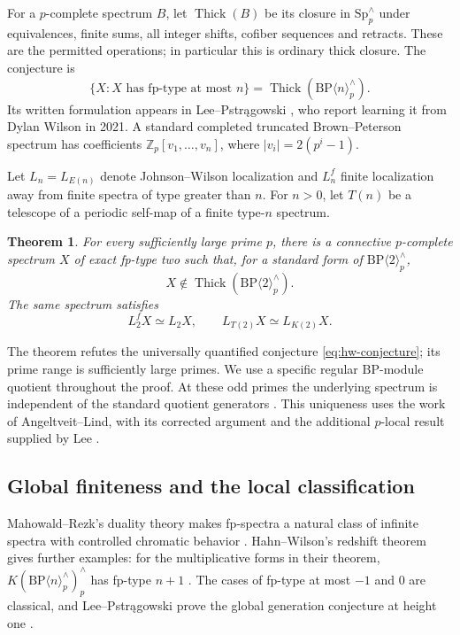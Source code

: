 \documentclass[11pt]{article}
\DeclareMathOperator{\Thick}{Thick}
\newcommand{\Sp}{\mathrm{Sp}}
\newcommand{\BP}{\mathrm{BP}}
\newcommand{\Z}{\mathbb Z}
\newtheorem{theorem}{Theorem}[section]
\theoremstyle{definition}
\theoremstyle{remark}
\numberwithin{equation}{section}
\begin{document}
For a $p$-complete spectrum $B$, let $\Thick(B)$ be its closure in
$\Sp_p^\wedge$ under equivalences, finite sums, all integer shifts,
cofiber sequences and retracts. These are the permitted operations;
in particular this is ordinary thick closure. The conjecture is
\begin{equation}\label{eq:hw-conjecture}
 \{X:\text{$X$ has fp-type at most $n$}\}
 =\Thick(\BP\langle n\rangle_p^\wedge).
\end{equation}
Its written formulation appears in Lee--Pstr\k{a}gowski
\cite[Conjecture~1.1 and Note~1]{LP2026}, who report learning it from Dylan Wilson
in 2021. A standard completed truncated Brown--Peterson spectrum has
coefficients $\Z_p[v_1,\ldots,v_n]$, where $|v_i|=2(p^i-1)$.

Let $L_n=L_{E(n)}$ denote Johnson--Wilson localization and $L_n^f$
finite localization away from finite spectra of type greater than $n$.
For $n>0$, let $T(n)$ be a telescope of a periodic self-map of a finite
type-$n$ spectrum.

\begin{theorem}\label{thm:main}
For every sufficiently large prime $p$, there is a connective
$p$-complete spectrum $X$ of exact fp-type two such that, for a
standard form of $\BP\langle2\rangle_p^\wedge$,
\[
 X\notin\Thick(\BP\langle2\rangle_p^\wedge).
\]
The same spectrum satisfies
\[
 L_2^fX\simeq L_2X,
 \qquad L_{T(2)}X\simeq L_{K(2)}X.
\]
\end{theorem}

The theorem refutes the universally quantified conjecture
\eqref{eq:hw-conjecture}; its prime range is sufficiently large primes.
We use a specific regular $\BP$-module quotient throughout the proof.
At these odd primes the underlying spectrum is independent of the
standard quotient generators \cite[Corollary~1.9]{Lee2026}.
This uniqueness uses the work of Angeltveit--Lind, with its corrected
argument and the additional $p$-local result supplied by Lee
\cite{AL2017,Lee2026}.

\subsection{Global finiteness and the local classification}

Mahowald--Rezk's duality theory makes fp-spectra a natural class of
infinite spectra with controlled chromatic behavior
\cite[Theorem~8.11]{MR1999}. Hahn--Wilson's redshift theorem gives
further examples: for the multiplicative forms in their theorem,
$K(\BP\langle n\rangle_p^\wedge)_p^\wedge$ has fp-type $n+1$
\cite[Theorem~B]{HW2022}. The cases of fp-type at most $-1$ and $0$
are classical, and Lee--Pstr\k{a}gowski prove the global generation
conjecture at height one
\cite[Theorems~1.3 and~5.4]{LP2026}.
\end{document}
